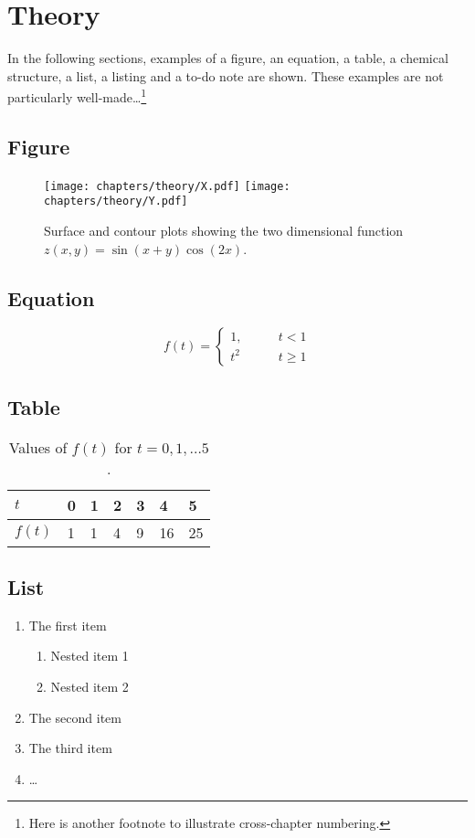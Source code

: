 \chapter{Theory}

In the following sections, examples of a figure, an equation, a table, a
chemical structure, a list, a listing and a to-do note are shown. These
examples are not particularly well-made\dots\footnote{Here is another footnote
	to illustrate cross-chapter numbering.}%

\section{Figure}
\begin{figure}[H]
	\centering
	\texttt{[image: chapters/theory/X.pdf]}
	\texttt{[image: chapters/theory/Y.pdf]}
	\caption{Surface and contour plots showing the two dimensional function $z(x,y)=\sin(x+y)\cos(2x)$.}
\end{figure}

\section{Equation}
\begin{equation}
	f(t)=\left\{%
	\begin{array}{ll}
		1,\qquad & t< 1    \\
		t^2      & t\geq 1
	\end{array}\right.
\end{equation}

\section{Table}
\begin{table}[H]
	\centering
	\caption[This (instead of the potentially long caption) appears in the list of tables.]{Values of $f(t)$ for $t=0,1,\dots 5$.}
	\begin{tabular}{lllllll}
		\toprule
		$t$    & 0 & 1 & 2 & 3 & 4  & 5  \\ \midrule
		$f(t)$ & 1 & 1 & 4 & 9 & 16 & 25 \\ \bottomrule
	\end{tabular}
\end{table}

\section{List}
\begin{enumerate}
	\item The first item
	      \begin{enumerate}
		      \item Nested item 1
		      \item Nested item 2
	      \end{enumerate}
	\item The second item
	\item The third item
	\item \dots
\end{enumerate}

